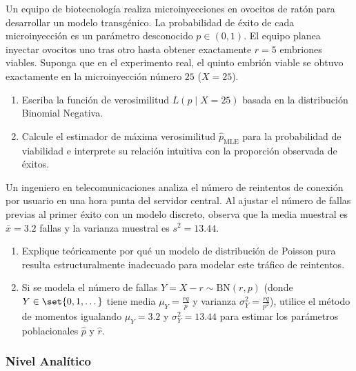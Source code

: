 \begin{problema}
	\label{prob:3.5.5}
	Un equipo de biotecnología realiza microinyecciones en ovocitos de ratón para desarrollar un modelo transgénico. La probabilidad de éxito de cada microinyección es un parámetro desconocido $p \in (0, 1)$. El equipo planea inyectar ovocitos uno tras otro hasta obtener exactamente $r = 5$ embriones viables. Suponga que en el experimento real, el quinto embrión viable se obtuvo exactamente en la microinyección número $25$ ($X = 25$).
	\begin{enumerate}
		\item Escriba la función de verosimilitud $L(p \mid X = 25)$ basada en la distribución Binomial Negativa.
		\item Calcule el estimador de máxima verosimilitud $\hat{p}_{\text{MLE}}$ para la probabilidad de viabilidad e interprete su relación intuitiva con la proporción observada de éxitos.
	\end{enumerate}
\end{problema}

\begin{problema}
	\label{prob:3.5.6}
	Un ingeniero en telecomunicaciones analiza el número de reintentos de conexión por usuario en una hora punta del servidor central. Al ajustar el número de fallas previas al primer éxito con un modelo discreto, observa que la media muestral es $\bar{x} = 3.2$ fallas y la varianza muestral es $s^2 = 13.44$.
	\begin{enumerate}
		\item Explique teóricamente por qué un modelo de distribución de Poisson pura resulta estructuralmente inadecuado para modelar este tráfico de reintentos.
		\item Si se modela el número de fallas $Y = X - r \sim \text{BN}(r, p)$ (donde $Y \in \set{0, 1, \dots}$ tiene media $\mu_Y = \frac{rq}{p}$ y varianza $\sigma_Y^2 = \frac{rq}{p^2}$), utilice el método de momentos igualando $\mu_Y = 3.2$ y $\sigma_Y^2 = 13.44$ para estimar los parámetros poblacionales $\hat{p}$ y $\hat{r}$.
	\end{enumerate}
\end{problema}

\subsubsection*{Nivel Analítico}

